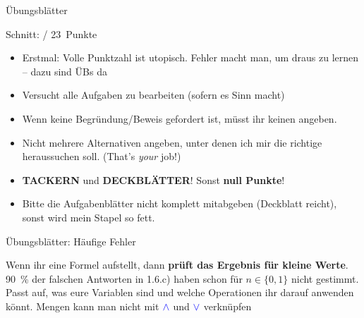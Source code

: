 





\graphicspath{{../figures/}}

\morescalingdelimiters



\begin{frame}{Übungsblätter}
	
	Schnitt:  / 23~Punkte
	
	\begin{itemize}
		\item Erstmal: Volle Punktzahl ist utopisch. Fehler macht man, um draus zu lernen – dazu sind ÜBs da
		\item Versucht alle Aufgaben zu bearbeiten (sofern es Sinn macht)
		\item Wenn keine Begründung/Beweis gefordert ist, müsst ihr keinen angeben.
		\item Nicht mehrere Alternativen angeben, unter denen ich mir die richtige heraussuchen soll. (That's \emph{your} job!)
		\item \textbf{TACKERN} und \textbf{DECKBLÄTTER}! Sonst \alert{\textbf{null Punkte}}!
		\item Bitte die Aufgabenblätter nicht komplett mitabgeben (Deckblatt reicht), sonst wird mein Stapel so fett. \smiley
	\end{itemize}
	
\end{frame}

\begin{frame}[t]{Übungsblätter: Häufige Fehler}
	
	
	\medskip

	\pause[9]
	Wenn ihr eine Formel aufstellt, dann \textbf{prüft das Ergebnis für kleine Werte}.\\[0.2em]
	90~\% der falschen Antworten in 1.6.c) haben schon für $n \in \{0, 1\}$ nicht gestimmt.\\[0.5em]
	
	\pause[10]
	Passt auf, was eure Variablen sind und welche Operationen ihr darauf anwenden könnt. Mengen kann man nicht mit $\mathbin{\textcolor{blue}{\wedge}}$ und $\mathbin{\textcolor{blue}{\vee}}$ verknüpfen
\end{frame}

